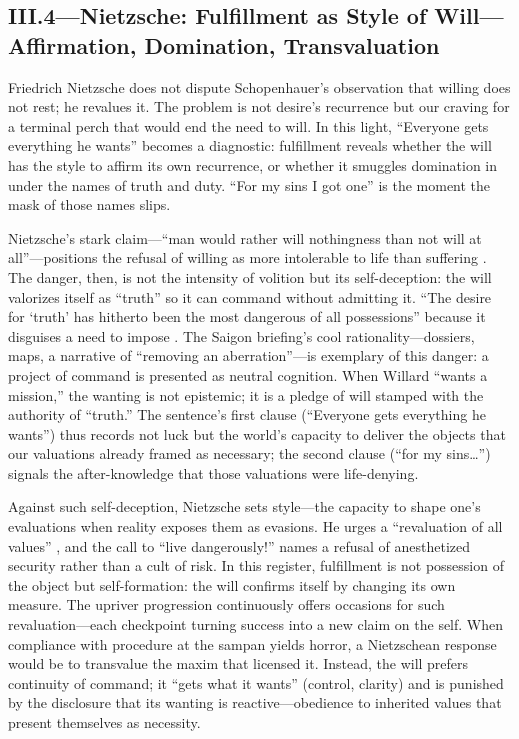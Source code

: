 \subsection*{III.4—Nietzsche: Fulfillment as Style of Will—Affirmation, Domination, Transvaluation}
\label{ssec:iii-nietzsche}
Friedrich Nietzsche does not dispute Schopenhauer's observation that willing does not rest; he
revalues it. The problem is not desire's recurrence but our craving for a terminal perch that
would end
the need to will. In this light, ``Everyone gets everything he wants'' becomes a diagnostic:
fulfillment reveals whether the will has the style to affirm its own recurrence, or whether it
smuggles domination in under the names of truth and duty. ``For my sins I got one'' is the
moment the mask of those names slips.

Nietzsche's stark claim—``man would rather will nothingness than not will at all''—positions
the refusal of willing as more intolerable to life than suffering
\parencite[III.28, p.~162]{NietzscheGenealogy1994}. The danger, then, is not the intensity of
volition but its self-deception: the will valorizes itself as ``truth'' so it can command
without admitting it. ``The desire for `truth' has hitherto been the most dangerous of all
possessions'' because it disguises a need to impose \parencite[\S 34]{NietzscheBGE1990}.
The Saigon briefing's cool rationality—dossiers, maps, a narrative of ``removing an
aberration''—is exemplary of this danger: a project of command is presented as neutral cognition.
When Willard ``wants a mission,'' the wanting is not epistemic; it is a pledge of will stamped
with the authority of ``truth.'' The sentence's first clause (``Everyone gets everything he
wants'') thus records not luck but the world's capacity to deliver the objects that our
valuations already framed as necessary; the second clause (``for my sins\ldots'') signals
the after-knowledge that those valuations were life-denying.

Against such self-deception, Nietzsche sets style—the capacity to shape one's evaluations when
reality exposes them as evasions. He urges a ``revaluation of all values''
\parencite[\S\S 203--211]{NietzscheBGE1990}, and the call to ``live dangerously!''
\parencite[\S 283]{NietzscheBGE1990} names a refusal of anesthetized security rather than a
cult of risk. In this register, fulfillment is not possession of the object but self-formation:
the will confirms itself by changing its own measure. The upriver progression continuously
offers occasions for such revaluation—each checkpoint turning success into a new claim on the
self. When compliance with procedure at the sampan yields horror, a Nietzschean response would
be to transvalue the maxim that licensed it. Instead, the will prefers continuity of command;
it ``gets what it wants'' (control, clarity) and is punished by the disclosure that its wanting
is reactive—obedience to inherited values that present themselves as necessity.

